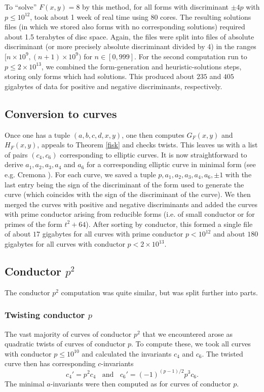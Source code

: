 To ``solve'' $F(x,y)=8$ by this method,  for all forms with discriminant $\pm 4p$ with $p\leq 10^{12}$, took about 1 
week of real time using 80 cores. The resulting solutions files (in which we stored also  forms with no corresponding 
solutions) required about 1.5 terabytes of disc space. Again, the files were split into files of absolute discriminant 
(or more precisely absolute discriminant divided by 4) in the ranges $[n \times 10^9, (n+1)\times 10^9)$ for 
$n\in[0,999]$. For the second computation run to $p \leq 2\times 10^{13}$, we combined the form-generation and 
heuristic-solutions steps, storing only forms which had solutions. This produced about $235$ and $405$ gigabytes of 
data for positive and negative discriminants, respectively. 

\subsection{Conversion to curves}
Once one has a tuple $(a,b,c,d,x,y)$, one then computes $G_F(x,y)$ and $H_F(x,y)$, appeals to Theorem \ref{fisk} and 
checks twists. This leaves us with a list of pairs $(c_4,c_6)$ corresponding to elliptic curves. It is now 
straightforward to derive $a_1,a_2,a_3,a_4$ and $a_6$ for a corresponding elliptic curve in minimal form (see e.g. 
Cremona \cite{Cre2}).  For each curve, we saved a tuple $p,a_1,a_2,a_3,a_4,a_6,\pm1$ with the last entry being the sign 
of the discriminant of the form used to generate the curve (which coincides with the sign of the discriminant of the 
curve). We then merged the curves with positive and negative discriminants and added the curves with prime conductor 
arising from reducible forms (i.e. of small conductor or for primes of the form $t^2+64$). After sorting by conductor, 
this formed a single file of about $17$ gigabytes for all curves with prime conductor $p < 10^{12}$ and about $180$ 
gigabytes for all curves with conductor $p<2\times10^{13}$.


\subsection{Conductor $p^2$}
The conductor $p^2$ computation was quite similar, but was split further into parts. 
\subsubsection{Twisting conductor $p$}
The vast majority of curves of conductor $p^2$ that we encountered arose as quadratic twists of curves of conductor 
$p$. To compute these, we took all curves with conductor $p \leq 10^{10}$ and calculated the invariants 
$c_4$ and $c_6$. The twisted curve then has corresponding $c$-invariants
$$
  c_4' = p^2 c_4  \; \; \mbox{ and } \; \;  c_6' = (-1)^{(p-1)/2}  p^3 c_6.
$$
The minimal $a$-invariants were then computed as for curves of 
conductor $p$. 

